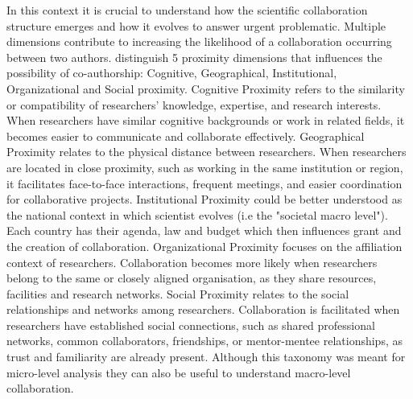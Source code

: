 In this context it is crucial to understand how the scientific collaboration structure emerges and how it evolves to answer urgent problematic. Multiple dimensions contribute to increasing the likelihood of a collaboration occurring between two authors. \cite{boschma2005proximity} distinguish 5 proximity dimensions that influences the possibility of co-authorship: Cognitive, Geographical, Institutional, Organizational and Social proximity. Cognitive Proximity refers to the similarity or compatibility of researchers' knowledge, expertise, and research interests. When researchers have similar cognitive backgrounds or work in related fields, it becomes easier to communicate and collaborate effectively. Geographical Proximity relates to the physical distance between researchers. When researchers are located in close proximity, such as working in the same institution or region, it facilitates face-to-face interactions, frequent meetings, and easier coordination for collaborative projects. Institutional Proximity could be better understood as the national context in which scientist evolves (i.e the "societal macro level"). Each country has their agenda, law and budget which then influences grant and the creation of collaboration. Organizational Proximity focuses on the affiliation context of researchers. Collaboration becomes more likely when researchers belong to the same or closely aligned organisation, as they share resources, facilities and research networks. Social Proximity relates to the social relationships and networks among researchers. Collaboration is facilitated when researchers have established social connections, such as shared professional networks, common collaborators, friendships, or mentor-mentee relationships, as trust and familiarity are already present. Although this taxonomy was meant for micro-level analysis they can also be useful to understand macro-level collaboration.

